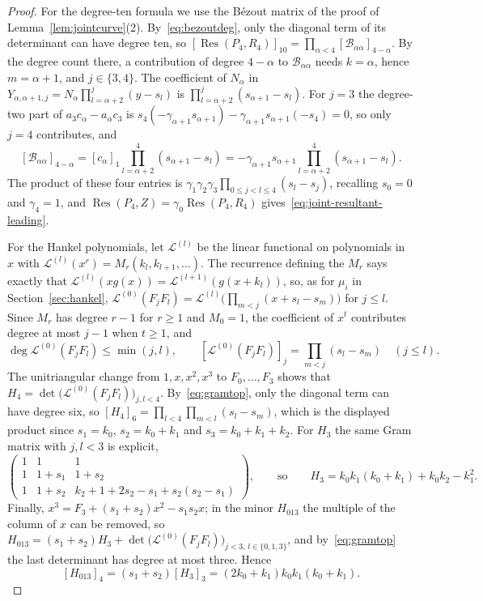 \documentclass[11pt]{article}
\theoremstyle{definition}
\theoremstyle{remark}
\begin{document}
\begin{proof}
For the degree-ten formula we use the B\'ezout matrix of the proof of
Lemma~\ref{lem:jointcurve}(2). By~\eqref{eq:bezoutdeg}, only the diagonal
term of its determinant can have degree ten, so
$[\operatorname{Res}(P_4,R_4)]_{10}=\prod_{\alpha<4}[\mathcal B_{\alpha\alpha}]_{4-\alpha}$.
By the degree count there, a contribution of degree $4-\alpha$ to
$\mathcal B_{\alpha\alpha}$ needs $k=\alpha$, hence $m=\alpha+1$, and $j\in\{3,4\}$.
The coefficient of $N_\alpha$ in $Y_{\alpha,\alpha+1,j}=N_\alpha\prod_{l=\alpha+2}^{j}(y-s_l)$
is $\prod_{l=\alpha+2}^{j}(s_{\alpha+1}-s_l)$. For $j=3$ the degree-two part of
$a_3c_\alpha-a_\alpha c_3$ is
$s_4(-\gamma_{\alpha+1}s_{\alpha+1})-\gamma_{\alpha+1}s_{\alpha+1}(-s_4)=0$, so only
$j=4$ contributes, and
\[
 [\mathcal B_{\alpha\alpha}]_{4-\alpha}=[c_\alpha]_1\prod_{l=\alpha+2}^{4}(s_{\alpha+1}-s_l)
 =-\gamma_{\alpha+1}s_{\alpha+1}\prod_{l=\alpha+2}^{4}(s_{\alpha+1}-s_l).
\]
The product of these four entries is
$\gamma_1\gamma_2\gamma_3\prod_{0\le j<l\le4}(s_l-s_j)$, recalling $s_0=0$ and $\gamma_4=1$, and
$\operatorname{Res}(P_4,Z)=\gamma_0\operatorname{Res}(P_4,R_4)$
gives~\eqref{eq:joint-resultant-leading}.

For the Hankel polynomials, let $\mathcal L^{(l)}$ be the linear functional on
polynomials in $x$ with $\mathcal L^{(l)}(x^r)=M_r(k_l,k_{l+1},\dots)$. The
recurrence defining the $M_r$ says exactly that
$\mathcal L^{(l)}(xg(x))=\mathcal L^{(l+1)}(g(x+k_l))$, so, as for $\mu_i$ in
Section~\ref{sec:hankel},
$\mathcal L^{(0)}(F_jF_l)=\mathcal L^{(l)}\bigl(\prod_{m<j}(x+s_l-s_m)\bigr)$ for
$j\le l$. Since $M_r$ has degree $r-1$ for $r\ge1$ and $M_0=1$, the coefficient
of $x^t$ contributes degree at most $j-1$ when $t\ge1$, and
\begin{equation}\label{eq:gramtop}
 \deg\mathcal L^{(0)}(F_jF_l)\le\min(j,l),\qquad
 [\mathcal L^{(0)}(F_jF_l)]_j=\prod_{m<j}(s_l-s_m)\quad(j\le l).
\end{equation}
The unitriangular change from $1,x,x^2,x^3$ to $F_0,\dots,F_3$ shows that
$H_4=\det\bigl(\mathcal L^{(0)}(F_jF_l)\bigr)_{j,l<4}$. By~\eqref{eq:gramtop},
only the diagonal term can have degree six, so
$[H_4]_6=\prod_{l<4}\prod_{m<l}(s_l-s_m)$, which is the displayed product since
$s_1=k_0$, $s_2=k_0+k_1$ and $s_3=k_0+k_1+k_2$. For $H_3$ the same Gram matrix
with $j,l<3$ is explicit,
\[
 \begin{pmatrix}1&1&1\\1&1+s_1&1+s_2\\1&1+s_2&k_2+1+2s_2-s_1+s_2(s_2-s_1)\end{pmatrix},
 \qquad\text{so}\qquad
 H_3=k_0k_1(k_0+k_1)+k_0k_2-k_1^2.
\]
Finally, $x^3=F_3+(s_1+s_2)x^2-s_1s_2x$; in the minor $H_{013}$ the multiple of
the column of $x$ can be removed, so
$H_{013}=(s_1+s_2)H_3+\det\bigl(\mathcal L^{(0)}(F_jF_l)\bigr)_{j<3,\,l\in\{0,1,3\}}$,
and by~\eqref{eq:gramtop} the last determinant has degree at most three. Hence
\begin{equation}\label{eq:H013top}
 [H_{013}]_4=(s_1+s_2)[H_3]_3=(2k_0+k_1)k_0k_1(k_0+k_1).
\end{equation}


\end{proof}
\end{document}
